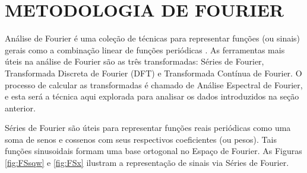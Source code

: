 
\chapter{METODOLOGIA DE FOURIER}

Análise de Fourier é uma coleção de técnicas para representar funções (ou sinais) gerais como a combinação linear de funções periódicas \cite{li1999fourier}. As ferramentas mais úteis na análise de Fourier são as três transformadas: Séries de Fourier, Transformada Discreta de Fourier (DFT) e Transformada Contínua de Fourier. O processo de calcular as transformadas é chamado de Análise Espectral de Fourier, e esta será a técnica aqui explorada para analisar os dados introduzidos na seção anterior.

Séries de Fourier são úteis para representar funções reais periódicas como uma soma de senos e cossenos com seus respectivos coeficientes (ou pesos). Tais funções sinusoidais formam uma base ortogonal no Espaço de Fourier. As Figuras \ref{fig:FSsqw} e \ref{fig:FSx} ilustram a representação de sinais via Séries de Fourier.

